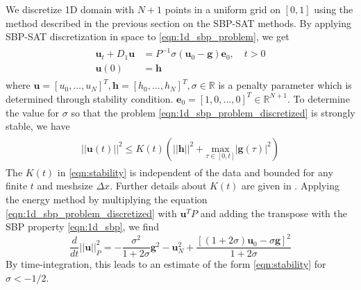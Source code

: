We discretize 1D domain with $N+1$ points in a uniform grid on $[0,1]$ using the method described in the previous section on the SBP-SAT methods. By applying SBP-SAT discretization in space to \autoref{eqn:1d_sbp_problem}, we get
\begin{align}
    \begin{split}
        \boldsymbol{u}_t + D_1\boldsymbol{u} &= P^{-1}\sigma(\boldsymbol{u}_0 - \boldsymbol{g}) \boldsymbol{e}_0, \quad t > 0\\
        \boldsymbol{u}(0) &= \boldsymbol{h}
    \end{split}
    \label{eqn:1d_sbp_problem_discretized}
\end{align}
where $\boldsymbol{u} = [u_0,\dots,u_N]^T, \boldsymbol{h} = [h_0,\dots,h_N]^T, \sigma \in \mathbb{R}$ is a penalty parameter which is determined through stability condition. $\boldsymbol{e}_0 = [1,0,\dots,0]^T\in\mathbb{R}^{N+1}$. To determine the value for $\sigma$ so that the problem \autoref{eqn:1d_sbp_problem_discretized} is strongly stable, we have 
\begin{align}
    \begin{split}
        ||\boldsymbol{u}(t)||^2 \leq K(t)(||\boldsymbol{h}||^2 + \underset{\tau \in [0,t]}{\text{max}}|\boldsymbol{g}(\tau)|^2)
    \end{split}
    \label{eqn:stability}
\end{align}
The $K(t)$ in \autoref{eqn:stability} is independent of the data and bounded for any finite $t$ and meshsize $\Delta x$. Further details about $K(t)$ are given in \citep{SVARD201417,gustafsson1995time}.
Applying the energy method by multiplying the equation \autoref{eqn:1d_sbp_problem_discretized} with $\boldsymbol{u}^TP$ and adding the transpose with the SBP property \autoref{eqn:1d_sbp}, we find
\begin{equation}
    \frac{d}{dt}||\boldsymbol{u}||_P^2 = - \frac{\sigma^2}{1+2\sigma}\boldsymbol{g}^2 - \boldsymbol{u}_N^2 + \frac{[(1+2\sigma)\boldsymbol{u}_0 - \sigma\boldsymbol{g}]^2}{1+2\sigma}
\end{equation}
By time-integration, this leads to an estimate of the form \autoref{eqn:stability} for $\sigma < -1/2$.

